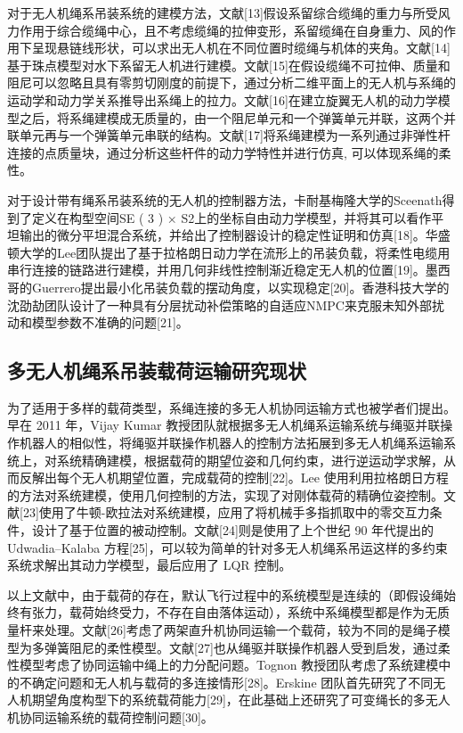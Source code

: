 \documentclass[lang=chs, degree=master, blindreview=false, winfonts=true]{yanputhesis}
\begin{document}
对于无人机绳系吊装系统的建模方法，文献[13]假设系留综合缆绳的重力与所受风力作用于综合缆绳中心，且不考虑缆绳的拉伸变形，系留缆绳在自身重力、风的作用下呈现悬链线形状，可以求出无人机在不同位置时缆绳与机体的夹角。文献[14]基于珠点模型对水下系留无人机进行建模。文献[15]在假设缆绳不可拉伸、质量和阻尼可以忽略且具有零剪切刚度的前提下，通过分析二维平面上的无人机与系绳的运动学和动力学关系推导出系绳上的拉力。文献[16]在建立旋翼无人机的动力学模型之后，将系绳建模成无质量的，由一个阻尼单元和一个弹簧单元并联，这两个并联单元再与一个弹簧单元串联的结构。文献[17]将系绳建模为一系列通过非弹性杆连接的点质量块，通过分析这些杆件的动力学特性并进行仿真, 可以体现系绳的柔性。

对于设计带有绳系吊装系统的无人机的控制器方法，卡耐基梅隆大学的Sceenath得到了定义在构型空间SE ( 3 ) × S2上的坐标自由动力学模型，并将其可以看作平坦输出的微分平坦混合系统，并给出了控制器设计的稳定性证明和仿真[18]。华盛顿大学的Lee团队提出了基于拉格朗日动力学在流形上的吊装负载，将柔性电缆用串行连接的链路进行建模，并用几何非线性控制渐近稳定无人机的位置[19]。墨西哥的Guerrero提出最小化吊装负载的摆动角度，以实现稳定[20]。香港科技大学的沈劭劼团队设计了一种具有分层扰动补偿策略的自适应NMPC来克服未知外部扰动和模型参数不准确的问题[21]。


\subsection{多无人机绳系吊装载荷运输研究现状}
为了适用于多样的载荷类型，系绳连接的多无人机协同运输方式也被学者们提出。早在 2011 年，Vijay Kumar 教授团队就根据多无人机绳系运输系统与绳驱并联操作机器人的相似性，将绳驱并联操作机器人的控制方法拓展到多无人机绳系运输系统上，对系统精确建模，根据载荷的期望位姿和几何约束，进行逆运动学求解，从而反解出每个无人机期望位置，完成载荷的控制[22]。Lee 使用利用拉格朗日方程的方法对系统建模，使用几何控制的方法，实现了对刚体载荷的精确位姿控制。文献[23]使用了牛顿-欧拉法对系统建模，应用了将机械手多指抓取中的零交互力条件，设计了基于位置的被动控制。文献[24]则是使用了上个世纪 90 年代提出的 Udwadia–Kalaba 方程[25]，可以较为简单的针对多无人机绳系吊运这样的多约束系统求解出其动力学模型，最后应用了 LQR 控制。

以上文献中，由于载荷的存在，默认飞行过程中的系统模型是连续的（即假设绳始终有张力，载荷始终受力，不存在自由落体运动），系统中系绳模型都是作为无质量杆来处理。文献[26]考虑了两架直升机协同运输一个载荷，较为不同的是绳子模型为多弹簧阻尼的柔性模型。文献[27]也从绳驱并联操作机器人受到启发，通过柔性模型考虑了协同运输中绳上的力分配问题。Tognon 教授团队考虑了系统建模中的不确定问题和无人机与载荷的多连接情形[28]。Erskine 团队首先研究了不同无人机期望角度构型下的系统载荷能力[29]，在此基础上还研究了可变绳长的多无人机协同运输系统的载荷控制问题[30]。
\end{document}
